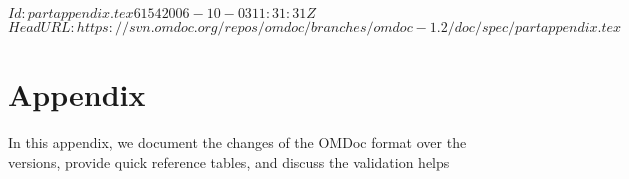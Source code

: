 \svnInfo $Id: partappendix.tex 6154 2006-10-03 11:31:31Z  $
\svnKeyword $HeadURL: https://svn.omdoc.org/repos/omdoc/branches/omdoc-1.2/doc/spec/partappendix.tex $

\part{Appendix}\label{part:appendix}
  In this appendix, we document the changes of the OMDoc format over the versions,
  provide quick reference tables, and discuss the validation helps

